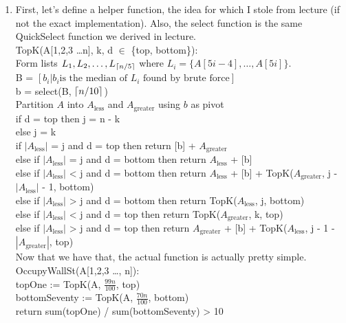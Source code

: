 \documentclass[11pt]{article}
\begin{document}
\begin{solution}
    \begin{enumerate}
        \item First, let's define a helper function, the idea for which I stole from lecture (if not the exact implementation). Also, the select function is the same QuickSelect function we derived in lecture. \\
            TopK(A[1,2,3 \ldots n], k, d $\in$ \{top, bottom\}):\\
            Form lists $L_1, L_2, \ldots, L_{\lceil n / 5 \rceil}$ where $L_i = \{A[5i - 4],\ldots,A[5i]\}$. \\
            B = $[ b_i | b_i \text{is the median of }L_i \text{ found by brute force}]$ \\ 
            b = select(B, $\lceil n / 10 \rceil$) \\
            Partition $A$ into $A_\text{less}$ and $A_\text{greater}$ using $b$ as pivot \\
            if d = top then j = n - k \\
            else j = k \\
            if $|A_\text{less}|$ = j and d = top then return [b] + $A_\text{greater}$ \\ 
            else if $|A_\text{less}|$ = j and d = bottom then return $A_\text{less}$ + [b] \\ 
            else if $|A_\text{less}|$ < j and d = bottom then return $A_\text{less}$ + [b] + TopK($A_\text{greater}$, j - $|A_\text{less}|$ - 1, bottom) \\
            else if $|A_\text{less}|$ > j and d = bottom then return TopK($A_\text{less}$, j, bottom) \\
            else if $|A_\text{less}|$ < j and d = top then return TopK($A_\text{greater}$, k, top) \\
            else if $|A_\text{less}|$ > j and d = top then return $A_\text{greater}$ + [b] + TopK($A_\text{less}$, j - 1 - $|A_\text{greater}|$, top) \\

            Now that we have that, the actual function is actually pretty simple. \\
            OccupyWallSt(A[1,2,3 \ldots, n]): \\
            topOne := TopK(A, $\frac{99n}{100}$, top) \\
            bottomSeventy := TopK(A, $\frac{70n}{100}$, bottom) \\
            return sum(topOne) / sum(bottomSeventy) > 10


\end{enumerate}
\end{solution}
\end{document}
